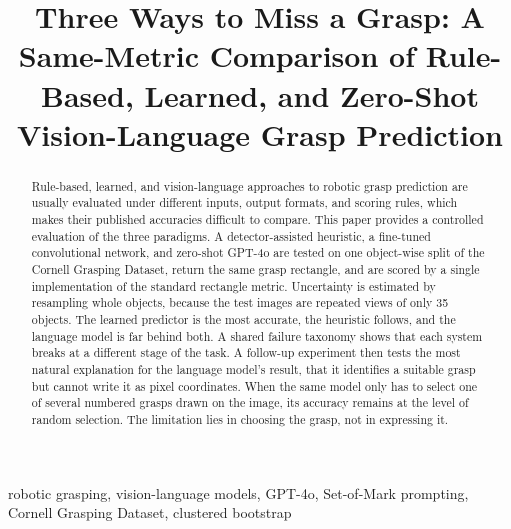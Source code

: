 \documentclass[10pt,conference,compsoc]{IEEEtran}
\title{Three Ways to Miss a Grasp: A Same-Metric Comparison of Rule-Based, Learned, and Zero-Shot Vision-Language Grasp Prediction}
\author{\IEEEauthorblockN{Anish Talla}
\IEEEauthorblockA{Lightridge High School and Academies of Loudoun\\
Virginia, United States\\
anish.talla99@gmail.com\\
\textit{Code and data:} \url{https://github.com/anishtalla27/Vision-Based-Grasping}}}
\begin{document}
\maketitle

\begin{abstract}
Rule-based, learned, and vision-language approaches to robotic grasp
prediction are usually evaluated under different inputs, output formats, and
scoring rules, which makes their published accuracies difficult to compare.
This paper provides a controlled evaluation of the three paradigms. A
detector-assisted heuristic, a fine-tuned convolutional network, and
zero-shot GPT-4o are tested on one object-wise split of the Cornell Grasping
Dataset, return the same grasp rectangle, and are scored by a single
implementation of the standard rectangle metric. Uncertainty is estimated by
resampling whole objects, because the test images are repeated views of only
35 objects. The learned predictor is the most accurate, the heuristic follows,
and the language model is far behind both. A shared failure taxonomy shows
that each system breaks at a different stage of the task. A follow-up
experiment then tests the most natural explanation for the language model's
result, that it identifies a suitable grasp but cannot write it as pixel
coordinates. When the same model only has to select one of several numbered
grasps drawn on the image, its accuracy remains at the level of random
selection. The limitation lies in choosing the grasp, not in expressing it.
\end{abstract}

\begin{IEEEkeywords}
robotic grasping, vision-language models, GPT-4o, Set-of-Mark prompting,
Cornell Grasping Dataset, clustered bootstrap
\end{IEEEkeywords}
\end{document}

